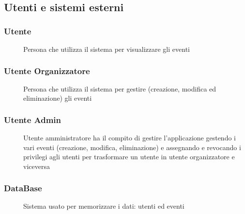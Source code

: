 \documentclass{article}
\begin{document}
\subsection{Utenti e sistemi esterni}
\subsubsection{Utente}
\begin{description}
    \item[] Persona che utilizza il sistema per visualizzare gli eventi
\end{description}
\subsubsection{Utente Organizzatore}
\begin{description}
    \item[] Persona che utilizza il sistema per gestire (creazione, modifica ed eliminazione) gli eventi
\end{description}
\subsubsection{Utente Admin}
\begin{description}
    \item[] Utente amministratore ha il compito di gestire l'applicazione gestendo i vari eventi (creazione, modifica, eliminazione) e assegnando e revocando i privilegi agli utenti per trasformare un utente in utente organizzatore e viceversa
\end{description}
\subsubsection{DataBase}
\begin{description}
    \item[] Sistema usato per memorizzare i dati: utenti ed eventi
\end{description}
\end{document}
